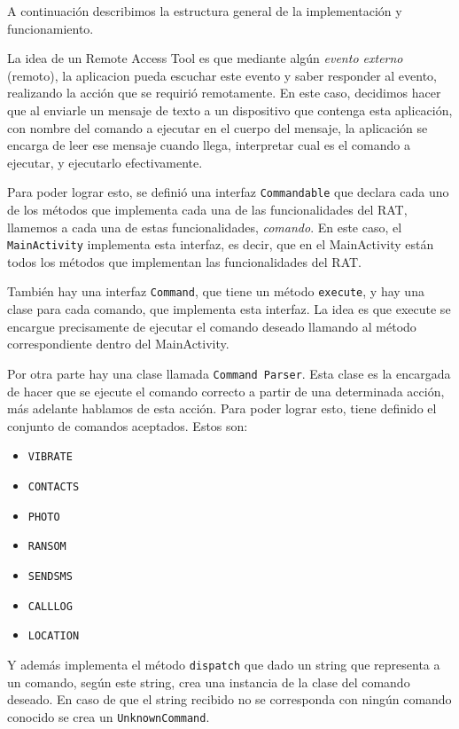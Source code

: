 A continuación describimos la estructura general de la implementación y funcionamiento.

La idea de un Remote Access Tool es que mediante algún \emph{evento externo} (remoto), la aplicacion pueda escuchar este evento y saber responder al evento, realizando la acción que se requirió remotamente. 
En este caso, decidimos hacer que al enviarle un mensaje de texto a un dispositivo que contenga esta aplicación, con nombre del comando a ejecutar en el cuerpo del mensaje, la aplicación se encarga de leer ese mensaje cuando llega, interpretar cual es el comando a ejecutar, y ejecutarlo efectivamente.

Para poder lograr esto, se definió una interfaz {\tt Commandable} que declara cada uno de los métodos que implementa cada una de las funcionalidades del RAT, llamemos a cada una de estas funcionalidades, \emph{comando}. En este caso, el {\tt MainActivity} implementa esta interfaz, es decir, que en el MainActivity están todos los métodos que implementan las funcionalidades del RAT.

También hay una interfaz {\tt Command}, que tiene un método {\tt execute}, y hay una clase para cada comando, que implementa esta interfaz. 
La idea es que execute se encargue precisamente de ejecutar el comando deseado llamando al método correspondiente dentro del MainActivity.

Por otra parte hay una clase llamada {\tt Command Parser}. Esta clase es la encargada de hacer que se ejecute el comando correcto a partir de una determinada acción, más adelante hablamos de esta acción. Para poder lograr esto, tiene definido el conjunto de comandos aceptados. Estos son:
\begin{itemize}
\item {\tt VIBRATE}
\item {\tt CONTACTS}
\item {\tt PHOTO}
\item {\tt RANSOM}
\item {\tt SENDSMS}
\item {\tt CALLLOG}
\item {\tt LOCATION}
\end{itemize}

Y además implementa el método {\tt dispatch} que dado un string que representa a un comando, según este string, crea una instancia de la clase del comando deseado. En caso de que el string recibido no se corresponda con ningún comando conocido se crea un {\tt UnknownCommand}.

